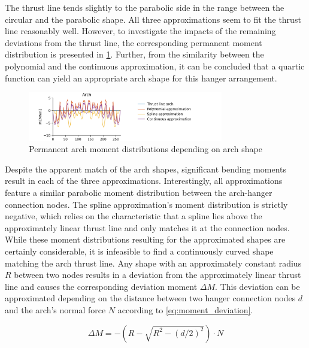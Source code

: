 The thrust line tends slightly to the parabolic side in the range between the circular and the parabolic shape. All three approximations seem to fit the thrust line reasonably well. However, to investigate the impacts of the remaining deviations from the thrust line, the corresponding permanent moment distribution is presented in \cref{fig:arch_permanent_moments_13}. Further, from the similarity between the polynomial and the continuous approximation, it can be concluded that a quartic function can yield an appropriate arch shape for this hanger arrangement. 

\begin{figure}[H]
    \centering
    \includegraphics[trim={1cm 0 3cm 0.48cm},clip, width=0.76\textwidth]{calculations/arch shape/permanent state_13.png}
    \caption{Permanent arch moment distributions depending on arch shape}
    \label{fig:arch_permanent_moments_13}
\end{figure}

Despite the apparent match of the arch shapes, significant bending moments result in each of the three approximations. Interestingly, all approximations feature a similar parabolic moment distribution between the arch-hanger connection nodes. The spline approximation's moment distribution is strictly negative, which relies on the characteristic that a spline lies above the approximately linear thrust line and only matches it at the connection nodes. While these moment distributions resulting for the approximated shapes are certainly considerable, it is infeasible to find a continuously curved shape matching the arch thrust line. Any shape with an approximately constant radius $R$ between two nodes results in a deviation from the approximately linear thrust line and causes the corresponding deviation moment $\Delta M$. This deviation can be approximated depending on the distance between two hanger connection nodes $d$ and the arch's normal force $N$ according to \cref{eq:moment_deviation}.

\begin{equation}
    \Delta M=-\left(R-\sqrt{R^2-\left(d/2\right)^2}\right) \cdot N
    \label{eq:moment_deviation}
\end{equation}

